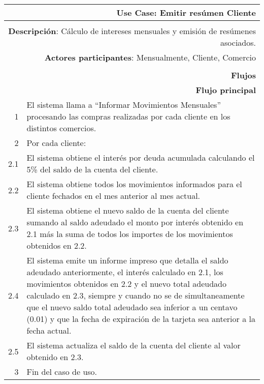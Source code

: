 \begin{tabularx}{\textwidth}{| r | X |}
\hline
\multicolumn{2}{|X|}{
\textbf{Use Case}: Emitir resúmen Cliente} \\

\hline
\multicolumn{2}{|c|}{\cellcolor[gray]{0.6}} \\

\hline
\multicolumn{2}{|X|}{
\textbf{Descripción}: Cálculo de intereses mensuales y emisión de
resúmenes asociados.} \\

\hline
\multicolumn{2}{|X|}{
\textbf{Actores participantes}: Mensualmente, Cliente, Comercio} \\

\hline
\multicolumn{2}{|c|}{\cellcolor[gray]{0.6} } \\

\hline
\multicolumn{2}{|X|}{
\textbf{Flujos}} \\

\hline
\multicolumn{2}{|X|}{
\textbf{Flujo principal}} \\

\hline
1 & El sistema llama a ``Informar Movimientos Mensuales'' procesando las compras realizadas por cada cliente en los distintos
comercios. \\

\hline
2 & Por cada cliente: \\
\hline
2.1 & El sistema obtiene el interés por deuda acumulada calculando el 5\% del
saldo de la cuenta del cliente. \\
\hline
2.2 & El sistema obtiene todos los movimientos informados para el cliente
fechados en el mes anterior al mes actual. \\
\hline
2.3 & El sistema obtiene el nuevo saldo de la cuenta del cliente sumando al
saldo adeudado el monto por interés obtenido en 2.1 más la suma de todos los
importes de los movimientos obtenidos en 2.2. \\
\hline
2.4 & El sistema emite un informe impreso que detalla el saldo adeudado
anteriormente, el interés calculado en 2.1, los movimientos obtenidos en 2.2 y
el nuevo total adeudado calculado en 2.3, siempre y cuando no se de
simultaneamente que el nuevo saldo total adeudado sea inferior a un centavo
(0.01) y que la fecha de expiración de la tarjeta sea anterior a la fecha
actual.\\
\hline
2.5 & El sistema actualiza el saldo de la cuenta del cliente al valor obtenido en 2.3. \\
\hline
3 & Fin del caso de uso. \\

\hline
\end{tabularx}

